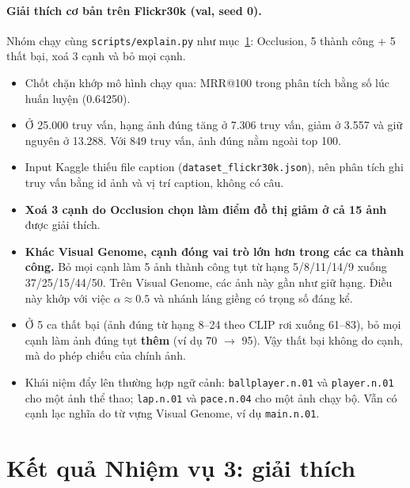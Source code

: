 \documentclass[12pt, a4paper]{article}
\makeatletter
\newcommand{\code}[1]{\texttt{#1}}
\newcommand{\mrr}{MRR@100}
\makeatother
\begin{document}
\paragraph{Giải thích cơ bản trên Flickr30k (val, seed 0).} Nhóm chạy cùng \code{scripts/explain.py} như mục~\ref{sec:xai}: Occlusion, 5 thành công + 5 thất bại, xoá 3 cạnh và bỏ mọi cạnh.
\begin{itemize}
\item Chốt chặn khớp mô hình chạy qua: \mrr{} trong phân tích bằng số lúc huấn luyện (0.64250).
\item Ở 25.000 truy vấn, hạng ảnh đúng tăng ở 7.306 truy vấn, giảm ở 3.557 và giữ nguyên ở 13.288. Với 849 truy vấn, ảnh đúng nằm ngoài top 100.
\item Input Kaggle thiếu file caption (\code{dataset\_flickr30k.json}), nên phân tích ghi truy vấn bằng id ảnh và vị trí caption, không có câu.
\item \textbf{Xoá 3 cạnh do Occlusion chọn làm điểm đồ thị giảm ở cả 15 ảnh} được giải thích.
\item \textbf{Khác Visual Genome, cạnh đóng vai trò lớn hơn trong các ca thành công.} Bỏ mọi cạnh làm 5 ảnh thành công tụt từ hạng 5/8/11/14/9 xuống 37/25/15/44/50. Trên Visual Genome, các ảnh này gần như giữ hạng. Điều này khớp với việc $\alpha \approx 0.5$ và nhánh láng giềng có trọng số đáng kể.
\item Ở 5 ca thất bại (ảnh đúng từ hạng 8--24 theo CLIP rơi xuống 61--83), bỏ mọi cạnh làm ảnh đúng tụt \textbf{thêm} (ví dụ 70 $\to$ 95). Vậy thất bại không do cạnh, mà do phép chiếu của chính ảnh.
\item Khái niệm đẩy lên thường hợp ngữ cảnh: \code{ballplayer.n.01} và \code{player.n.01} cho một ảnh thể thao; \code{lap.n.01} và \code{pace.n.04} cho một ảnh chạy bộ. Vẫn có cạnh lạc nghĩa do từ vựng Visual Genome, ví dụ \code{main.n.01}.
\end{itemize}

\section{Kết quả Nhiệm vụ 3: giải thích}
\label{sec:xai}
\end{document}
